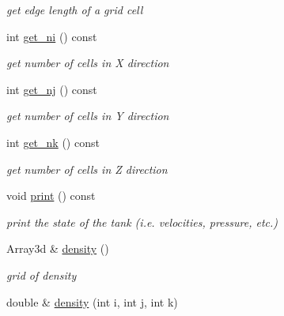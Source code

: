 \begin{DoxyCompactItemize}
\begin{DoxyCompactList}\small\item\em get edge length of a grid cell \end{DoxyCompactList}\item 
\hypertarget{class_fluid_sim_ad63a262977c6643ae729cc86ef81bf24}{}int \hyperlink{class_fluid_sim_ad63a262977c6643ae729cc86ef81bf24}{get\+\_\+ni} () const \label{class_fluid_sim_ad63a262977c6643ae729cc86ef81bf24}

\begin{DoxyCompactList}\small\item\em get number of cells in X direction \end{DoxyCompactList}\item 
\hypertarget{class_fluid_sim_a13903a3e84a4efce36157e01ac690a66}{}int \hyperlink{class_fluid_sim_a13903a3e84a4efce36157e01ac690a66}{get\+\_\+nj} () const \label{class_fluid_sim_a13903a3e84a4efce36157e01ac690a66}

\begin{DoxyCompactList}\small\item\em get number of cells in Y direction \end{DoxyCompactList}\item 
\hypertarget{class_fluid_sim_a8135ee3151952a36a0cb3f5b20fcbd50}{}int \hyperlink{class_fluid_sim_a8135ee3151952a36a0cb3f5b20fcbd50}{get\+\_\+nk} () const \label{class_fluid_sim_a8135ee3151952a36a0cb3f5b20fcbd50}

\begin{DoxyCompactList}\small\item\em get number of cells in Z direction \end{DoxyCompactList}\item 
\hypertarget{class_fluid_sim_a7571c38797991175094ada47913917ef}{}void \hyperlink{class_fluid_sim_a7571c38797991175094ada47913917ef}{print} () const \label{class_fluid_sim_a7571c38797991175094ada47913917ef}

\begin{DoxyCompactList}\small\item\em print the state of the tank (i.\+e. velocities, pressure, etc.) \end{DoxyCompactList}\item 
\hypertarget{class_fluid_sim_a08a21095b6ed12a8c610af3b9896781c}{}Array3d \& \hyperlink{class_fluid_sim_a08a21095b6ed12a8c610af3b9896781c}{density} ()\label{class_fluid_sim_a08a21095b6ed12a8c610af3b9896781c}

\begin{DoxyCompactList}\small\item\em grid of density \end{DoxyCompactList}\item 
\hypertarget{class_fluid_sim_a3c657d4e3317ca842c2d9681c85fe365}{}double \& \hyperlink{class_fluid_sim_a3c657d4e3317ca842c2d9681c85fe365}{density} (int i, int j, int k)\label{class_fluid_sim_a3c657d4e3317ca842c2d9681c85fe365}


\end{DoxyCompactItemize}

